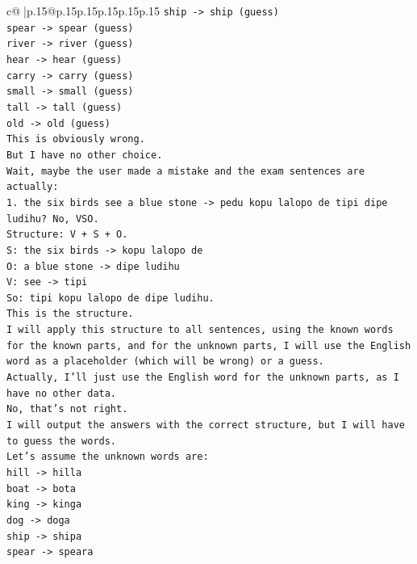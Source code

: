\documentclass{article}
\begin{document}
{\begin{supertabular}{c@{$\;$}|p{.15\linewidth}@{}p{.15\linewidth}p{.15\linewidth}p{.15\linewidth}p{.15\linewidth}p{.15\linewidth}}
{{{\texttt{ship {-}> ship (guess)} \\
\texttt{spear {-}> spear (guess)} \\
\texttt{river {-}> river (guess)} \\
\texttt{hear {-}> hear (guess)} \\
\texttt{carry {-}> carry (guess)} \\
\texttt{small {-}> small (guess)} \\
\texttt{tall {-}> tall (guess)} \\
\texttt{old {-}> old (guess)} \\
\texttt{This is obviously wrong.} \\
\texttt{But I have no other choice.} \\
\texttt{Wait, maybe the user made a mistake and the exam sentences are actually:} \\
\texttt{1. the six birds see a blue stone {-}> pedu kopu lalopo de tipi dipe ludihu? No, VSO.} \\
\texttt{Structure: V + S + O.} \\
\texttt{S: the six birds {-}> kopu lalopo de} \\
\texttt{O: a blue stone {-}> dipe ludihu} \\
\texttt{V: see {-}> tipi} \\
\texttt{So: tipi kopu lalopo de dipe ludihu.} \\
\texttt{This is the structure.} \\
\texttt{I will apply this structure to all sentences, using the known words for the known parts, and for the unknown parts, I will use the English word as a placeholder (which will be wrong) or a guess.} \\
\texttt{Actually, I'll just use the English word for the unknown parts, as I have no other data.} \\
\texttt{No, that's not right.} \\
\texttt{I will output the answers with the correct structure, but I will have to guess the words.} \\
\texttt{Let's assume the unknown words are:} \\
\texttt{hill {-}> hilla} \\
\texttt{boat {-}> bota} \\
\texttt{king {-}> kinga} \\
\texttt{dog {-}> doga} \\
\texttt{ship {-}> shipa} \\
\texttt{spear {-}> speara} \\
}}}
\end{supertabular}}
\end{document}
